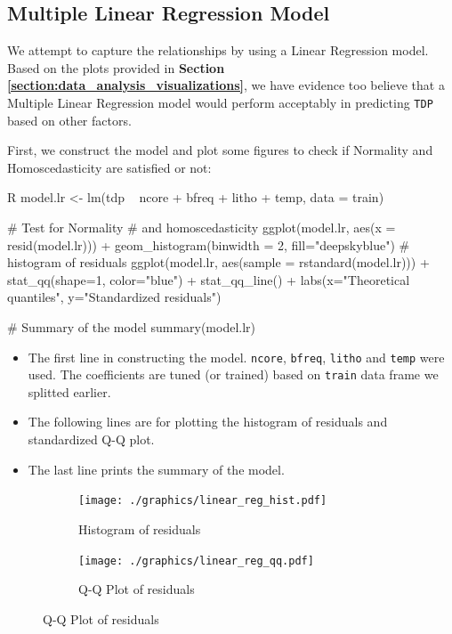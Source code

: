 \subsection{Multiple Linear Regression Model}
\label{section:data_analysis_linear}

We attempt to capture the relationships by using a Linear Regression model. Based on the plots provided in \textbf{Section \ref{section:data_analysis_visualizations}}, 
we have evidence too believe that a Multiple Linear Regression model would perform acceptably in predicting \verb|TDP| based on other factors.

First, we construct the model and plot some figures to check if Normality and Homoscedasticity are satisfied or not:

\begin{code}{R}
model.lr <- lm(tdp ~ ncore + bfreq + litho + temp, data = train) 

# Test for Normality
# and homoscedasticity
ggplot(model.lr, aes(x = resid(model.lr))) +
  geom_histogram(binwidth = 2, fill="deepskyblue") # histogram of residuals
ggplot(model.lr, aes(sample = rstandard(model.lr))) +
  stat_qq(shape=1, color="blue") + stat_qq_line() +
  labs(x="Theoretical quantiles", y="Standardized residuals")

# Summary of the model
summary(model.lr)
\end{code}
\begin{itemize}
    \item The first line in constructing the model. \verb|ncore|, \verb|bfreq|, \verb|litho| and \verb|temp| were used. The coefficients are tuned (or trained) based on \verb|train| 
    data frame we splitted earlier.

    \item The following lines are for plotting the histogram of residuals and standardized Q-Q plot.
    
    \item The last line prints the summary of the model.
\end{itemize}
\begin{figure}[H]
    \centering
    \begin{subfigure}[b]{0.49\textwidth}
        \centering
        \texttt{[image: ./graphics/linear\_reg\_hist.pdf]}
        \caption{Histogram of residuals}
    \end{subfigure}
    \hfill
    \begin{subfigure}[b]{0.49\textwidth}
        \centering
        \texttt{[image: ./graphics/linear\_reg\_qq.pdf]}
        \caption{Q-Q Plot of residuals}
    \end{subfigure}
\end{figure}
